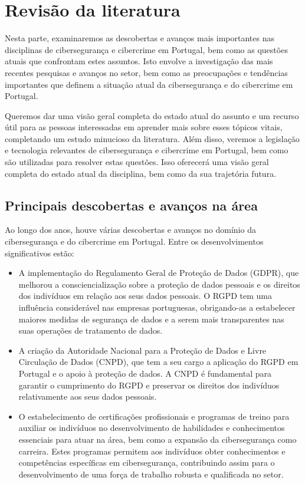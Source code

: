 \chapter{Revisão da literatura}

Nesta parte, examinaremos as descobertas e avanços mais importantes nas disciplinas de cibersegurança e cibercrime em Portugal, bem como as questões atuais que confrontam estes assuntos. Isto envolve a investigação das mais recentes pesquisas e avanços no setor, bem como as preocupações e tendências importantes que definem a situação atual da cibersegurança e do cibercrime em Portugal.

Queremos dar uma visão geral completa do estado atual do assunto e um recurso útil para as pessoas interessadas em aprender mais sobre esses tópicos vitais, completando um estudo minucioso da literatura. Além disso, veremos a legislação e tecnologia relevantes de cibersegurança e cibercrime em Portugal, bem como são utilizadas para resolver estas questões. Isso oferecerá uma visão geral completa do estado atual da disciplina, bem como da sua trajetória futura.

\section{Principais descobertas e avanços na área}

Ao longo dos anos, houve várias descobertas e avanços no domínio da cibersegurança e do cibercrime em Portugal. Entre os desenvolvimentos significativos estão:

\begin{itemize}
  \item A implementação do Regulamento Geral de Proteção de Dados (GDPR), que melhorou a consciencialização sobre a proteção de dados pessoais e os direitos dos indivíduos em relação aos seus dados pessoais. O RGPD tem uma influência considerável nas empresas portuguesas, obrigando-as a estabelecer maiores medidas de segurança de dados e a serem mais transparentes nas suas operações de tratamento de dados.
  \item A criação da Autoridade Nacional para a Proteção de Dados e Livre Circulação de Dados (CNPD), que tem a seu cargo a aplicação do RGPD em Portugal e o apoio à proteção de dados. A CNPD é fundamental para garantir o cumprimento do RGPD e preservar os direitos dos indivíduos relativamente aos seus dados pessoais.
  \item O estabelecimento de certificações profissionais e programas de treino para auxiliar os indivíduos no desenvolvimento de habilidades e conhecimentos essenciais para atuar na área, bem como a expansão da cibersegurança como carreira. Estes programas permitem aos indivíduos obter conhecimentos e competências específicas em cibersegurança, contribuindo assim para o desenvolvimento de uma força de trabalho robusta e qualificada no setor.
\end{itemize}

